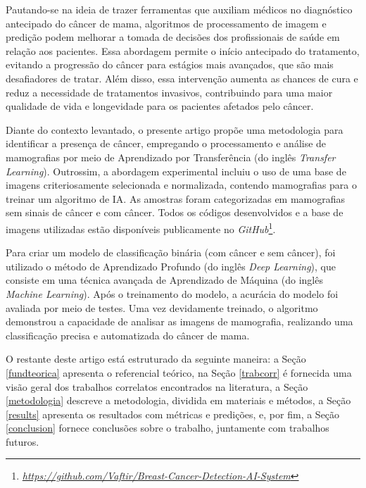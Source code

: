 Pautando-se na ideia de trazer ferramentas que auxiliam médicos no diagnóstico antecipado do câncer de mama, algoritmos de processamento de imagem e predição podem melhorar a tomada de decisões dos profissionais de saúde em relação aos pacientes. Essa abordagem permite o início antecipado do tratamento, evitando a progressão do câncer para estágios mais avançados, que são mais desafiadores de tratar. Além disso, essa intervenção aumenta as chances de cura e reduz a necessidade de tratamentos invasivos, contribuindo para uma maior qualidade de vida e longevidade para os pacientes afetados pelo câncer.

Diante do contexto levantado, o presente artigo propõe uma metodologia para identificar a presença de câncer, empregando o processamento e análise de mamografias por meio de Aprendizado por Transferência (do inglês \textit{Transfer Learning}). Outrossim, a abordagem experimental incluiu o uso de uma base de imagens criteriosamente selecionada e normalizada, contendo mamografias para o treinar um algoritmo de IA. As amostras foram categorizadas em mamografias sem sinais de câncer e com câncer. Todos os códigos desenvolvidos e a base de imagens utilizadas estão disponíveis publicamente no \textit{GitHub}\footnote{\href{https://github.com/Vaftir/Breast-Cancer-Detection-AI-System}{\textit{https://github.com/Vaftir/Breast-Cancer-Detection-AI-System}}}.

Para criar um modelo de classificação binária (com câncer e sem câncer), foi utilizado o método de Aprendizado Profundo (do inglês \textit{Deep Learning}), que consiste em uma técnica avançada de Aprendizado de Máquina (do inglês \textit{Machine Learning}). Após o treinamento do modelo, a acurácia do modelo foi avaliada por meio de testes. Uma vez devidamente treinado, o algoritmo demonstrou a capacidade de analisar as imagens de mamografia, realizando uma classificação precisa e automatizada do câncer de mama.

O restante deste artigo está estruturado da seguinte maneira: a Seção \ref{fundteorica} apresenta o referencial teórico, na Seção \ref{trabcorr} é fornecida uma visão geral dos trabalhos correlatos encontrados na literatura, a Seção \ref{metodologia} descreve a metodologia, dividida em materiais e métodos, a Seção \ref{results} apresenta os resultados com métricas e predições, e, por fim, a Seção \ref{conclusion} fornece conclusões sobre o trabalho, juntamente com trabalhos futuros.




